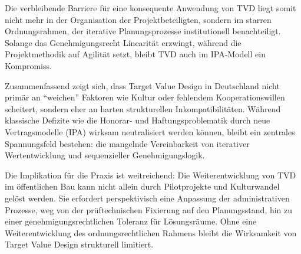 Die verbleibende Barriere für eine konsequente Anwendung von \acs{TVD} liegt somit nicht mehr in der Organisation der Projektbeteiligten, sondern im starren Ordnungsrahmen, der iterative Planungsprozesse institutionell benachteiligt. Solange das Genehmigungsrecht Linearität erzwingt, während die Projektmethodik auf Agilität setzt, bleibt \acs{TVD} auch im \acs{IPA}-Modell ein Kompromiss.


Zusammenfassend zeigt sich, dass Target Value Design in Deutschland nicht primär an \enquote{weichen} Faktoren wie Kultur oder fehlendem Kooperationswillen scheitert, sondern eher an harten strukturellen Inkompatibilitäten.
Während klassische Defizite wie die Honorar- und Haftungsproblematik durch neue Vertragsmodelle (\acs{IPA}) wirksam neutralisiert werden können, bleibt ein zentrales Spannungsfeld bestehen: die mangelnde Vereinbarkeit von iterativer Wertentwicklung und sequenzieller Genehmigungslogik.

Die Implikation für die Praxis ist weitreichend: Die Weiterentwicklung von \acs{TVD} im öffentlichen Bau kann nicht allein durch Pilotprojekte und Kulturwandel gelöst werden. Sie erfordert perspektivisch eine Anpassung der administrativen Prozesse, weg von der prüftechnischen Fixierung auf den Planungsstand, hin zu einer genehmigungsrechtlichen Toleranz für Lösungsräume. Ohne eine Weiterentwicklung des ordnungsrechtlichen Rahmens bleibt die Wirksamkeit von Target Value Design strukturell limitiert.



























